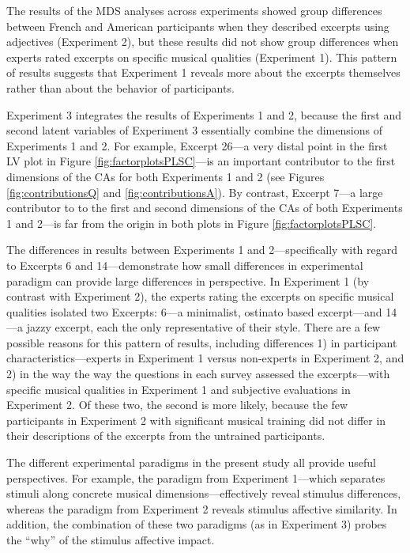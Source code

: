 \documentclass[
  english,
  man,floatsintext]{apa6}
\begin{document}
The results of the MDS analyses across experiments showed group differences between French and American participants when they described excerpts using adjectives (Experiment 2), but these results did not show group differences when experts rated excerpts on specific musical qualities (Experiment 1). This pattern of results suggests that Experiment 1 reveals more about the excerpts themselves rather than about the behavior of participants.

Experiment 3 integrates the results of Experiments 1 and 2, because the first and second latent variables of Experiment 3 essentially combine the dimensions of Experiments 1 and 2. For example, Excerpt 26---a very distal point in the first LV plot in Figure \ref{fig:factorplotsPLSC}---is an important contributor to the first dimensions of the CAs for both Experiments 1 and 2 (see Figures \ref{fig:contributionsQ} and \ref{fig:contributionsA}). By contrast, Excerpt 7---a large contributor to to the first and second dimensions of the CAs of both Experiments 1 and 2---is far from the origin in both plots in Figure \ref{fig:factorplotsPLSC}.

The differences in results between Experiments 1 and 2---specifically with regard to Excerpts 6 and 14---demonstrate how small differences in experimental paradigm can provide large differences in perspective. In Experiment 1 (by contrast with Experiment 2), the experts rating the excerpts on specific musical qualities isolated two Excerpts: 6---a minimalist, ostinato based excerpt---and 14---a jazzy excerpt, each the only representative of their style. There are a few possible reasons for this pattern of results, including differences 1) in participant characteristics---experts in Experiment 1 versus non-experts in Experiment 2, and 2) in the way the way the questions in each survey assessed the excerpts---with specific musical qualities in Experiment 1 and subjective evaluations in Experiment 2. Of these two, the second is more likely, because the few participants in Experiment 2 with significant musical training did not differ in their descriptions of the excerpts from the untrained participants.

The different experimental paradigms in the present study all provide useful perspectives. For example, the paradigm from Experiment 1---which separates stimuli along concrete musical dimensions---effectively reveal stimulus differences, whereas the paradigm from Experiment 2 reveals stimulus affective similarity. In addition, the combination of these two paradigms (as in Experiment 3) probes the ``why'' of the stimulus affective impact.
\end{document}
